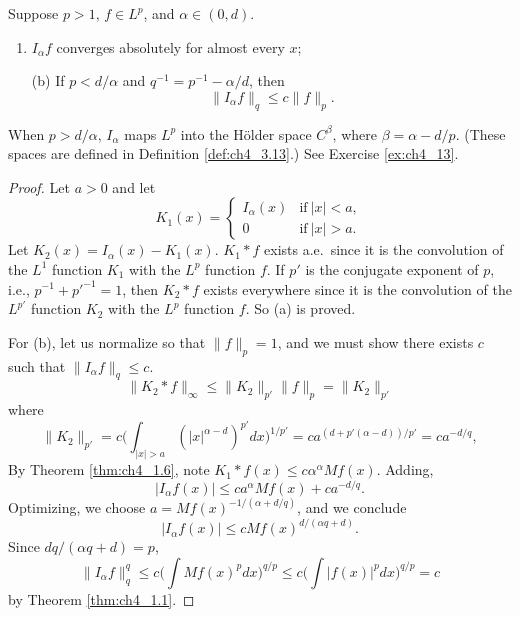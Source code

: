 
\begin{theorem}\label{thm:ch4_3.11}
Suppose $p > 1$, $f \in L^p$, and $\alpha \in (0,d)$.
\begin{enumerate}
    \item $I_\alpha f$ converges absolutely for almost every $x$;
    \item[(b)] If $p < d/\alpha$ and $q^{-1} = p^{-1} - \alpha/d$, then
    \[
        \|I_\alpha f\|_q \leq c\|f\|_p.
    \]
\end{enumerate}
\end{theorem}

\mpagebreak

When $p > d/\alpha$, $I_\alpha$ maps $L^p$ into the H\"older space $C^\beta$, where $\beta = \alpha - d/p$. (These spaces are defined in Definition \ref{def:ch4_3.13}.) See Exercise \ref{ex:ch4_13}.

\begin{proof}
Let $a > 0$ and let
\[
    K_1(x) = \begin{cases}
        I_\alpha(x) & \text{if}~|x| < a, \\
        0 & \text{if}~|x| > a.
    \end{cases}
\]
Let $K_2(x) = I_\alpha(x)-K_1(x)$. $K_1*f$ exists a.e.\ since it is the convolution of the $L^1$ function $K_1$ with the $L^p$ function $f$. If $p'$ is the conjugate exponent of $p$, i.e., $p^{-1}+p'^{-1} = 1$, then $K_2*f$ exists everywhere since it is the convolution of the $L^{p'}$ function $K_2$ with the $L^p$ function $f$. So (a) is proved.

For (b), let us normalize so that $\|f\|_p = 1$, and we must show there exists $c$ such that $\|I_\alpha f\|_q \leq c$.
\[
    \|K_2 * f\|_\infty \leq \|K_2\|_{p'}\|f\|_p = \|K_2\|_{p'}
\]
where
\[
    \|K_2\|_{p'} = c\Big(\int_{|x|>a} (|x|^{\alpha-d})^{p'}dx\Big)^{1/p'} = ca^{(d+p'(\alpha-d))/p'} = ca^{-d/q},
\]
By Theorem \ref{thm:ch4_1.6}, note $K_1 * f(x) \leq c\alpha^{\alpha}Mf(x)$. Adding,
\[
    |I_\alpha f(x)| \leq ca^{\alpha}Mf(x) + ca^{-d/q}.
\]
Optimizing, we choose $a = Mf(x)^{-1/(\alpha+d/q)}$, and we conclude
\[
    |I_\alpha f(x)| \leq cMf(x)^{d/(\alpha q+d)}.
\]
Since $dq/(\alpha q+d) = p$,
\[
    \|I_\alpha f\|_q^q \leq c\Big(\int Mf(x)^p dx\Big)^{q/p} \leq c\Big(\int |f(x)|^p dx\Big)^{q/p} = c
\]
by Theorem \ref{thm:ch4_1.1}.
\end{proof}


